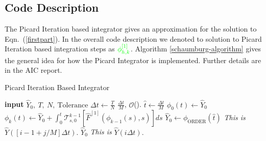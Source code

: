 \documentclass[oneside,12pt]{book}
\begin{document}
\clearpage

\subsection{Code Description}

The Picard Iteration based integrator gives an approximation for the solution to Eqn.\ (\ref{firstpart}).  In the overall code description we denoted to solution to Picard Iteration based integration steps as ${\color{green}\phi^{[1]}_{h,k}}$.  Algorithm \ref{schaumburg-algorithm} gives the general idea for how the Picard Integrator is implemented.  Further details are in the AIC report.
\begin{algorithm}[hp]
\caption{Picard Iteration Based Integrator}\label{schaumburg-algorithm}
\begin{algorithmic}
\State \textbf{input} $\hat{Y}_0, \ T, \ N, \ \text{Tolerance} $
\State $\Delta t \gets \frac{T}{N}$
	\State {} $\frac{\Delta t}{M}$,
	\State {}
	\State {} $\mathcal{O}$().
	\State $\hat{t} \gets \frac{\Delta t}{M}$
		\State $\phi_0(t) \gets \hat{Y}_0$ 
			\State $\phi_k(t) \gets \hat{Y}_0+\int^{t}_0 			\mathcal{T}^{k-1}_{s,0}\left[\hat{F}^{[1]}\left(\phi_{k-1}(s),s\right)\right] ds$
		\EndFor 
		\State $\hat{Y}_0 \gets \phi_\text{ORDER}(\hat{t})$  \Comment \textit{This is } $\hat{Y}\left( [i-1+j/M] \Delta t\right).$
    \EndFor
    \State {} $\hat{Y}_0$ \Comment \textit{This is } $\hat{Y}(i \Delta t).$
\EndFor
\end{algorithmic}
\end{algorithm}




%
\end{document}
